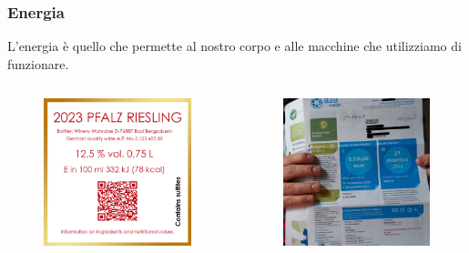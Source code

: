 \documentclass[handout]{beamer}
\theoremstyle{plain}
\begin{document}
\begin{frame}
\frametitle{Energia}
L'energia è quello che permette al nostro corpo e alle macchine che utilizziamo di funzionare.\pause

\begin{columns}
  \begin{column}{0.3\textwidth}
  \begin{figure}
    \includegraphics[width=\columnwidth]{img/etichetta.png}
  \end{figure}    
  \end{column}
  \begin{column}{0.3\textwidth}
  \begin{figure}
    \includegraphics[width=\columnwidth]{img/bolletta.jpg}

\end{figure}
\end{column}
\end{columns}
\end{frame}
\end{document}
